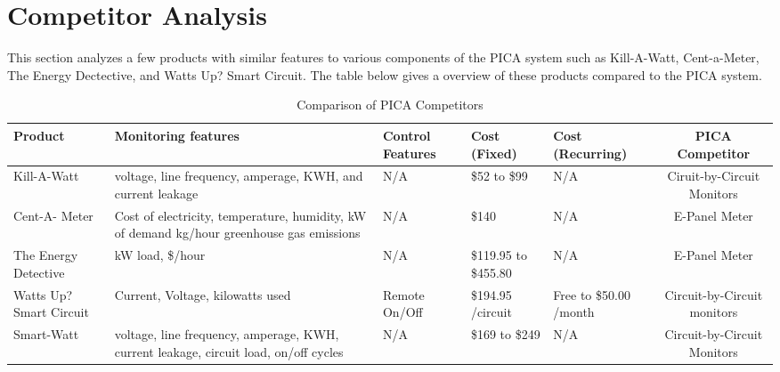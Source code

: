 \section{Competitor Analysis} %
This section analyzes a few products with similar features to various components of the PICA system such as Kill-A-Watt, Cent-a-Meter, The Energy Dectective, and Watts Up? Smart Circuit. The table below gives a overview of these products compared to the PICA system. %

\begin{table}[htdp]
\caption{Comparison of PICA Competitors}
\begin{center}
\begin{tabular}{|>{\centering}b{0.75in}|>{\raggedright}b{1.25in}|>{\raggedright}b{1in}|>{\raggedright}b{0.5in}|>{\raggedright}b{0.5in}|c|}\hline
\rowcolor{lightgray}Product & Monitoring features & Control Features & Cost (Fixed) & Cost (Recurring) & PICA Competitor\\\hline
Kill-A-Watt & voltage, line frequency, amperage, KWH, and current leakage & N/A & \$52 to \$99 & N/A & Ciruit-by-Circuit Monitors\\\hline 
Cent-A- Meter & Cost of electricity, temperature, humidity, kW of demand kg/hour greenhouse gas emissions & N/A & \$140 & N/A & E-Panel Meter\\\hline 
The Energy Detective & kW load, \$/hour & N/A & \$119.95 to \$455.80 & N/A & E-Panel Meter\\\hline
Watts Up? Smart Circuit & Current, Voltage, kilowatts used & Remote On/Off & \$194.95 /circuit & Free to \$50.00 /month & Circuit-by-Circuit monitors\\\hline
Smart-Watt & voltage, line frequency, amperage, KWH, current leakage, circuit load, on/off cycles & N/A & \$169 to \$249  & N/A & Circuit-by-Circuit Monitors\\\hline
\end{tabular}
\end{center}
\label{tab:competition_sum}
\end{table}%

